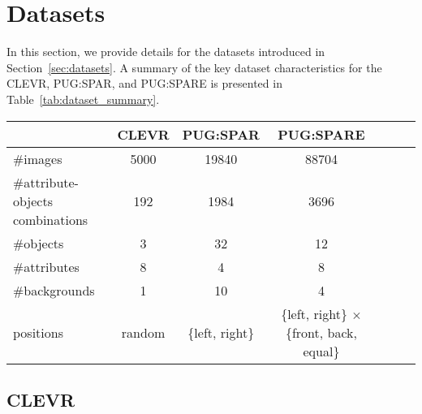 \clearpage
\setcounter{page}{1}
\maketitlesupplementary

























\section{Datasets}


\label{sec:datasets_extra}




In this section, we provide details for the datasets introduced in Section~\ref{sec:datasets}. A summary of the key dataset characteristics for the CLEVR, PUG:SPAR, and PUG:SPARE is presented in Table~\ref{tab:dataset_summary}.
\begin{table*}[]
\centering
\begin{tabular*}{\textwidth}{@{\extracolsep{\fill}}lcccccc}
\hline
 & \textbf{CLEVR} & \textbf{PUG:SPAR} & \textbf{PUG:SPARE} \\ 
\hline
\#images & 5000 & 19840 & 88704 \\
\#attribute-objects combinations & 192 & 1984 & 3696 \\
\#objects & 3 & 32 & 12 \\
\#attributes & 8 & 4 & 8 \\
\#backgrounds & 1 & 10 & 4 \\
positions & random & \{left, right\} & \{left, right\} $\times$ \{front, back, equal\} \\
\hline
\end{tabular*}
\caption{\textbf{Specifications for the datasets used to test attribute-object binding in a controlled setting.} For CLEVR, the number of attribute-object combinations only reflects the two-object case. For PUG:SPAR, the numbers represent the filtered dataset used in our experiments.}
\label{tab:dataset_summary}
\end{table*}

\subsection{CLEVR}

